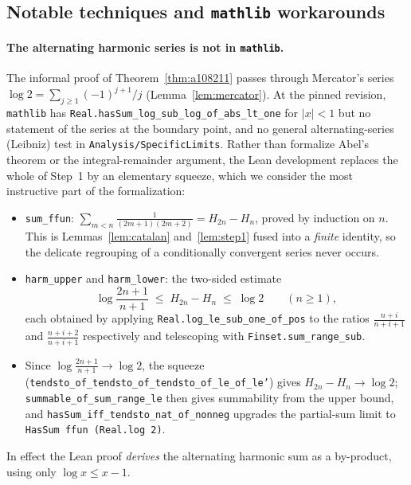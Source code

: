 \documentclass[11pt]{article}
\theoremstyle{plain}
\theoremstyle{definition}
\theoremstyle{remark}
\numberwithin{equation}{section}
\begin{document}
\subsection{Notable techniques and \texttt{mathlib} workarounds}

\paragraph{The alternating harmonic series is not in \texttt{mathlib}.}
The informal proof of Theorem~\ref{thm:a108211} passes through Mercator's series
$\log 2 = \sum_{j\ge1} (-1)^{j+1}/j$ (Lemma~\ref{lem:mercator}). At the pinned revision,
\texttt{mathlib} has \texttt{Real.hasSum\_log\_sub\_log\_of\_abs\_lt\_one} for $|x| < 1$ but no
statement of the series at the boundary point, and no general alternating-series (Leibniz) test
in \texttt{Analysis/SpecificLimits}. Rather than formalize Abel's theorem or the
integral-remainder argument, the Lean development replaces the whole of Step~1 by an elementary
squeeze, which we consider the most instructive part of the formalization:
\begin{itemize}
\item \texttt{sum\_ffun}: $\sum_{m < n} \frac{1}{(2m+1)(2m+2)} = H_{2n} - H_n$, proved by
induction on $n$. This is Lemmas~\ref{lem:catalan} and~\ref{lem:step1} fused into a
\emph{finite} identity, so the delicate regrouping of a conditionally convergent series never
occurs.
\item \texttt{harm\_upper} and \texttt{harm\_lower}: the two-sided estimate
\[
  \log\frac{2n+1}{n+1} \;\le\; H_{2n} - H_n \;\le\; \log 2 \qquad (n \ge 1),
\]
each obtained by applying \texttt{Real.log\_le\_sub\_one\_of\_pos} to the ratios
$\frac{n+i}{n+i+1}$ and $\frac{n+i+2}{n+i+1}$ respectively and telescoping with
\texttt{Finset.sum\_range\_sub}.
\item Since $\log\frac{2n+1}{n+1} \to \log 2$, the squeeze
(\texttt{tendsto\_of\_tendsto\_of\_tendsto\_of\_le\_of\_le'}) gives
$H_{2n}-H_n \to \log 2$; \texttt{summable\_of\_sum\_range\_le} then gives summability from the
upper bound, and \texttt{hasSum\_iff\_tendsto\_nat\_of\_nonneg} upgrades the partial-sum limit to
\texttt{HasSum ffun (Real.log 2)}.
\end{itemize}
In effect the Lean proof \emph{derives} the alternating harmonic sum as a by-product, using only
$\log x \le x-1$.
\end{document}
